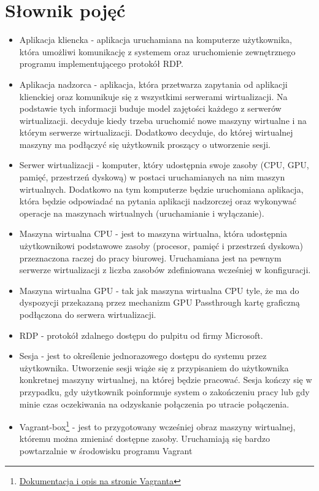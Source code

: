 \documentclass[12pt]{article}
\begin{document}
\section{Słownik pojęć}
\begin{itemize}
	\item Aplikacja kliencka - aplikacja uruchamiana na komputerze użytkownika, która umożliwi komunikację z systemem oraz uruchomienie zewnętrznego programu implementującego protokół RDP.
	\item Aplikacja nadzorca - aplikacja, która przetwarza zapytania od aplikacji klienckiej oraz komunikuje się z wszystkimi serwerami wirtualizacji. Na podstawie tych informacji buduje model zajętości każdego z serwerów wirtualizacji. decyduje kiedy trzeba uruchomić nowe maszyny wirtualne i na którym serwerze wirtualizacji. Dodatkowo decyduje, do której wirtualnej maszyny ma podłączyć się użytkownik proszący o utworzenie sesji.
	\item Serwer wirtualizacji - komputer, który udostępnia swoje zasoby (CPU, GPU, pamięć, przestrzeń dyskową) w postaci uruchamianych na nim maszyn wirtualnych. Dodatkowo na tym komputerze będzie uruchomiana aplikacja, która będzie odpowiadać na pytania aplikacji nadzorczej oraz wykonywać operacje na maszynach wirtualnych (uruchamianie i wyłączanie).
	\item Maszyna wirtualna CPU - jest to maszyna wirtualna, która udostępnia użytkownikowi podstawowe zasoby (procesor, pamięć i przestrzeń dyskowa) przeznaczona raczej do pracy biurowej. Uruchamiana jest na pewnym serwerze wirtualizacji z liczba zasobów zdefiniowana wcześniej w konfiguracji.
	\item Maszyna wirtualna GPU - tak jak maszyna wirtualna CPU tyle, że ma do dyspozycji przekazaną przez mechanizm GPU Passthrough kartę graficzną podłączona do serwera wirtualizacji.
	\item RDP - protokół zdalnego dostępu do pulpitu od firmy Microsoft.
	\item Sesja - jest to określenie jednorazowego dostępu do systemu przez użytkownika. Utworzenie sesji wiąże się z przypisaniem do użytkownika konkretnej maszyny wirtualnej, na której będzie pracować. Sesja kończy się w przypadku, gdy użytkownik poinformuje system o zakończeniu pracy lub gdy minie czas oczekiwania na odzyskanie połączenia po utracie połączenia.
	\item Vagrant-box\footnote{\href{https://www.vagrantup.com/docs/boxes}{Dokumentacja i opis na stronie Vagranta}} - jest to przygotowany wcześniej obraz maszyny wirtualnej, któremu można zmieniać dostępne zasoby. Uruchamiają się bardzo powtarzalnie w środowisku programu Vagrant

\end{itemize}
\end{document}
